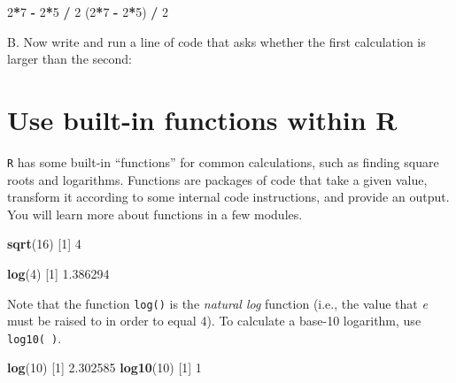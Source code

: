 \documentclass[
]{book}
\newenvironment{Shaded}{\begin{snugshade}}{\end{snugshade}}
\newcommand{\DecValTok}[1]{\textcolor[rgb]{0.00,0.00,0.81}{#1}}
\newcommand{\FloatTok}[1]{\textcolor[rgb]{0.00,0.00,0.81}{#1}}
\newcommand{\KeywordTok}[1]{\textcolor[rgb]{0.13,0.29,0.53}{\textbf{#1}}}
\newcommand{\NormalTok}[1]{#1}
\newcommand{\OperatorTok}[1]{\textcolor[rgb]{0.81,0.36,0.00}{\textbf{#1}}}
\newcommand{\StringTok}[1]{\textcolor[rgb]{0.31,0.60,0.02}{#1}}
\begin{document}
\begin{Shaded}
\begin{Highlighting}[]
\DecValTok{2}\OperatorTok{*}\DecValTok{7} \OperatorTok{-}\StringTok{ }\DecValTok{2}\OperatorTok{*}\DecValTok{5} \OperatorTok{/}\StringTok{ }\DecValTok{2}
\NormalTok{(}\DecValTok{2}\OperatorTok{*}\DecValTok{7} \OperatorTok{-}\StringTok{ }\DecValTok{2}\OperatorTok{*}\DecValTok{5}\NormalTok{) }\OperatorTok{/}\StringTok{ }\DecValTok{2}
\end{Highlighting}
\end{Shaded}

B. Now write and run a line of code that asks whether the first calculation is larger than the second:

\hypertarget{use-built-in-functions-within-r}{%
\section*{Use built-in functions within R}\label{use-built-in-functions-within-r}}

\texttt{R} has some built-in ``functions'' for common calculations, such as finding square roots and logarithms. Functions are packages of code that take a given value, transform it according to some internal code instructions, and provide an output. You will learn more about functions in a few modules.

\begin{Shaded}
\begin{Highlighting}[]
\KeywordTok{sqrt}\NormalTok{(}\DecValTok{16}\NormalTok{)}
\NormalTok{[}\DecValTok{1}\NormalTok{] }\DecValTok{4}

\KeywordTok{log}\NormalTok{(}\DecValTok{4}\NormalTok{)}
\NormalTok{[}\DecValTok{1}\NormalTok{] }\FloatTok{1.386294}
\end{Highlighting}
\end{Shaded}

Note that the function \texttt{log()} is the \emph{natural log} function (i.e., the value that \emph{e} must be raised to in order to equal 4). To calculate a base-10 logarithm, use \texttt{log10(\ )}.

\begin{Shaded}
\begin{Highlighting}[]
\KeywordTok{log}\NormalTok{(}\DecValTok{10}\NormalTok{)}
\NormalTok{[}\DecValTok{1}\NormalTok{] }\FloatTok{2.302585}
\KeywordTok{log10}\NormalTok{(}\DecValTok{10}\NormalTok{)}
\NormalTok{[}\DecValTok{1}\NormalTok{] }\DecValTok{1}
\end{Highlighting}
\end{Shaded}
\end{document}
